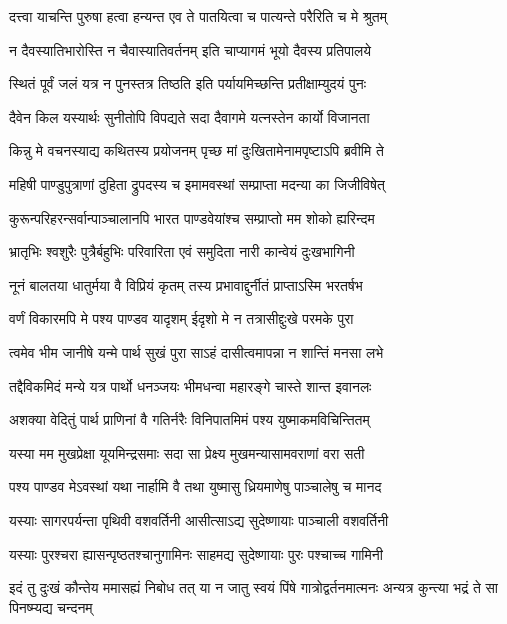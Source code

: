 \twolineshloka
{दत्त्वा याचन्ति पुरुषा हत्वा हन्यन्त एव ते}
{पातयित्वा च पात्यन्ते परैरिति च मे श्रुतम्}


\twolineshloka
{न दैवस्यातिभारोस्ति न चैवास्यातिवर्तनम्}
{इति चाप्यागमं भूयो दैवस्य प्रतिपालये}


\twolineshloka
{स्थितं पूर्वं जलं यत्र न पुनस्तत्र तिष्ठति}
{इति पर्यायमिच्छन्ति प्रतीक्षाम्युदयं पुनः}


\twolineshloka
{दैवेन किल यस्यार्थः सुनीतोपि विपद्यते}
{सदा दैवागमे यत्नस्तेन कार्यो विजानता}


\twolineshloka
{किन्नु मे वचनस्याद्य कथितस्य प्रयोजनम्}
{पृच्छ मां दुःखितामेनामपृष्टाऽपि ब्रवीमि ते}


\twolineshloka
{महिषी पाण्डुपुत्राणां दुहिता द्रुपदस्य च}
{इमामवस्थां सम्प्राप्ता मदन्या का जिजीविषेत्}


\twolineshloka
{कुरून्परिहरन्सर्वान्पाञ्चालानपि भारत}
{पाण्डवेयांश्च सम्प्राप्तो मम शोको ह्यरिन्दम}


\twolineshloka
{भ्रातृभिः श्वशुरैः पुत्रैर्बहुभिः परिवारिता}
{एवं समुदिता नारी कान्वेयं दुःखभागिनी}


\twolineshloka
{नूनं बालतया धातुर्मया वै विप्रियं कृतम्}
{तस्य प्रभावाद्दुर्नीतं प्राप्ताऽस्मि भरतर्षभ}


\twolineshloka
{वर्णं विकारमपि मे पश्य पाण्डव यादृशम्}
{ईदृशो मे न तत्रासीद्दुःखे परमके पुरा}


\twolineshloka
{त्वमेव भीम जानीषे यन्मे पार्थ सुखं पुरा}
{साऽहं दासीत्वमापन्ना न शान्तिं मनसा लभे}


\twolineshloka
{तद्दैविकमिदं मन्ये यत्र पार्थो धनञ्जयः}
{भीमधन्वा महारङ्गे चास्ते शान्त इवानलः}


\twolineshloka
{अशक्या वेदितुं पार्थ प्राणिनां वै गतिर्नरैः}
{विनिपातमिमं पश्य युष्माकमविचिन्तितम्}


\twolineshloka
{यस्या मम मुखप्रेक्षा यूयमिन्द्रसमाः सदा}
{सा प्रेक्ष्य मुखमन्यासामवराणां वरा सती}


\twolineshloka
{पश्य पाण्डव मेऽवस्थां यथा नार्हामि वै तथा}
{युष्मासु ध्रियमाणेषु पाञ्चालेषु च मानद}


\twolineshloka
{यस्याः सागरपर्यन्ता पृथिवी वशवर्तिनी}
{आसीत्साऽद्य सुदेष्णायाः पाञ्चाली वशवर्तिनी}


\twolineshloka
{यस्याः पुरश्चरा ह्यासन्पृष्ठतश्चानुगामिनः}
{साहमद्य सुदेष्णायाः पुरः पश्चाच्च गामिनी}


\threelineshloka
{इदं तु दुःखं कौन्तेय ममासह्यं निबोध तत्}
{या न जातु स्वयं पिंषे गात्रोद्वर्तनमात्मनः}
{अन्यत्र कुन्त्या भद्रं ते सा पिनष्म्यद्य चन्दनम्}


